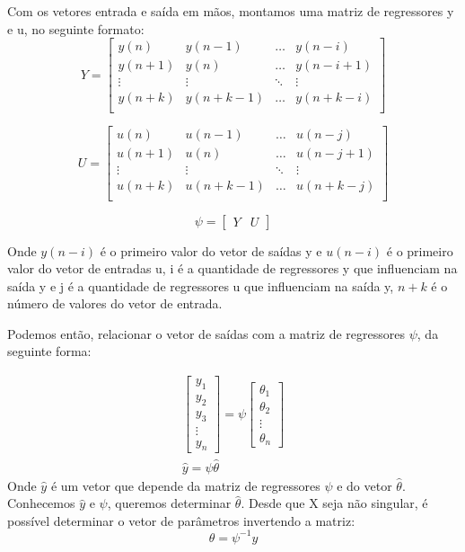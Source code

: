 Com os vetores entrada e saída em mãos, montamos uma matriz de regressores y e u, no seguinte formato:
\begin{equation}
Y=\begin{bmatrix}
y(n) & y(n-1) & \dots & y(n-i) \\
y(n+1) & y(n) & \dots & y(n-i+1) \\
\vdots & \vdots & \ddots & \vdots\\
y(n+k) & y(n+k-1) & \dots & y(n+k-i) \\
\end{bmatrix}
\end{equation}

\begin{equation}
U=\begin{bmatrix}
 u(n) & u(n-1) & \dots & u(n-j)\\
 u(n+1) & u(n) & \dots & u(n-j+1)\\
 \vdots & \vdots & \ddots  & \vdots\\
 u(n+k) & u(n+k-1) & \dots & u(n+k-j)\\
\end{bmatrix}
\end{equation}

\begin{equation}\label{eq:regressores}
\psi=
\begin{bmatrix}
Y & U
\end{bmatrix}
\end{equation}

Onde $y(n-i)$ é o primeiro valor do vetor de saídas y e $u(n-i)$ é o primeiro valor do vetor de entradas u, i é a quantidade de regressores y que influenciam na saída y e j é a quantidade de regressores u que influenciam na saída y, $n+k$ é o número de valores do vetor de entrada.



Podemos então, relacionar o vetor de saídas com a matriz de regressores $\psi$, da seguinte forma:

\begin{equation}
\begin{array}{c}
\begin{bmatrix}
y_1 \\ y_2 \\ y_3\\ \vdots \\ y_n
\end{bmatrix}
=
\psi
\begin{bmatrix}
\theta_1 \\ \theta_2 \\ \vdots \\ \theta_n
\end{bmatrix}
\\
\hat{y}=\psi \hat{\theta}
\end{array}
\end{equation}
Onde $\hat{y}$ é um vetor que depende da matriz de regressores $\psi$ e do vetor $\hat{\theta}$. Conhecemos $\hat{y}$ e $\psi$, queremos determinar $\hat{\theta}$. Desde que X seja não singular, é possível determinar o vetor de parâmetros invertendo a matriz:
\begin{equation}\label{eq:MQ}
\theta=\psi^{-1}y
\end{equation}

